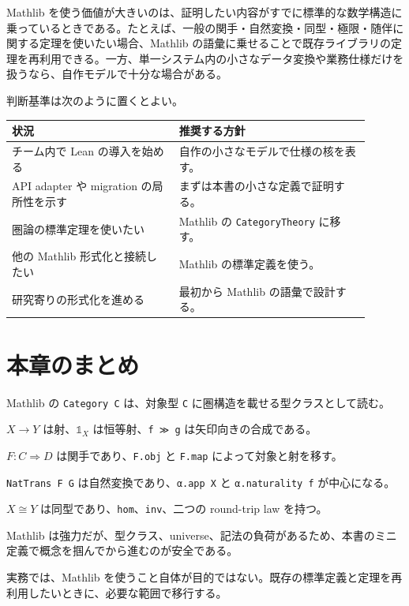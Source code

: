 \begin{softwarebox}
Mathlib を使う価値が大きいのは、証明したい内容がすでに標準的な数学構造に乗っているときである。たとえば、一般の関手・自然変換・同型・極限・随伴に関する定理を使いたい場合、Mathlib の語彙に乗せることで既存ライブラリの定理を再利用できる。一方、単一システム内の小さなデータ変換や業務仕様だけを扱うなら、自作モデルで十分な場合がある。
\end{softwarebox}

判断基準は次のように置くとよい。

\begin{longtable}{p{0.42\linewidth}p{0.48\linewidth}}
\toprule
状況 & 推奨する方針 \\
\midrule
チーム内で Lean の導入を始める & 自作の小さなモデルで仕様の核を表す。 \\
API adapter や migration の局所性を示す & まずは本書の小さな定義で証明する。 \\
圏論の標準定理を使いたい & Mathlib の \texttt{CategoryTheory} に移す。 \\
他の Mathlib 形式化と接続したい & Mathlib の標準定義を使う。 \\
研究寄りの形式化を進める & 最初から Mathlib の語彙で設計する。 \\
\bottomrule
\end{longtable}

\section{本章のまとめ}

Mathlib の \texttt{Category C} は、対象型 \texttt{C} に圏構造を載せる型クラスとして読む。

\(X \longrightarrow Y\) は射、\(\mathbb{1}_X\) は恒等射、\texttt{f ≫ g} は矢印向きの合成である。

\(F : C \Rightarrow D\) は関手であり、\texttt{F.obj} と \texttt{F.map} によって対象と射を移す。

\texttt{NatTrans F G} は自然変換であり、\texttt{α.app X} と \texttt{α.naturality f} が中心になる。

\(X \cong Y\) は同型であり、\texttt{hom}、\texttt{inv}、二つの round-trip law を持つ。

Mathlib は強力だが、型クラス、universe、記法の負荷があるため、本書のミニ定義で概念を掴んでから進むのが安全である。

実務では、Mathlib を使うこと自体が目的ではない。既存の標準定義と定理を再利用したいときに、必要な範囲で移行する。

